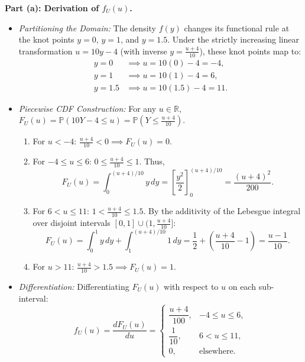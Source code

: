 \documentclass[11pt, letterpaper]{article}
\theoremstyle{definition}
\theoremstyle{remark}
\newcommand{\R}{\mathbb{R}}
\newcommand{\Prob}{\mathbb{P}}
\begin{document}
\textbf{Part (a): Derivation of $f_U(u)$.}
\begin{itemize}
    \item \textit{Partitioning the Domain:} The density $f(y)$ changes its functional rule at the knot points $y = 0$, $y = 1$, and $y = 1.5$. Under the strictly increasing linear transformation $u = 10y - 4$ (with inverse $y = \frac{u + 4}{10}$), these knot points map to:
    \begin{align*}
        y = 0 &\implies u = 10(0) - 4 = -4, \\
        y = 1 &\implies u = 10(1) - 4 = 6, \\
        y = 1.5 &\implies u = 10(1.5) - 4 = 11.
    \end{align*}
    \item \textit{Piecewise CDF Construction:} For any $u \in \R$, $F_U(u) = \Prob(10Y - 4 \le u) = \Prob\left(Y \le \frac{u + 4}{10}\right)$.
    \begin{enumerate}[label=\arabic*.]
        \item For $u < -4$: $\frac{u+4}{10} < 0 \implies F_U(u) = 0$.
        \item For $-4 \le u \le 6$: $0 \le \frac{u+4}{10} \le 1$. Thus,
        \[
            F_U(u) = \int_{0}^{(u+4)/10} y\,dy = \left[ \frac{y^2}{2} \right]_{0}^{(u+4)/10} = \frac{(u + 4)^2}{200}.
        \]
        \item For $6 < u \le 11$: $1 < \frac{u+4}{10} \le 1.5$. By the additivity of the Lebesgue integral over disjoint intervals $[0, 1] \cup (1, \frac{u+4}{10}]$:
        \[
            F_U(u) = \int_{0}^{1} y\,dy + \int_{1}^{(u+4)/10} 1\,dy = \frac{1}{2} + \left(\frac{u + 4}{10} - 1\right) = \frac{u - 1}{10}.
        \]
        \item For $u > 11$: $\frac{u+4}{10} > 1.5 \implies F_U(u) = 1$.
    \end{enumerate}
    \item \textit{Differentiation:} Differentiating $F_U(u)$ with respect to $u$ on each sub-interval:
    \[
        f_U(u) = \frac{dF_U(u)}{du} = \begin{cases} \dfrac{u + 4}{100}, & -4 \le u \le 6, \\[6pt] \dfrac{1}{10}, & 6 < u \le 11, \\[6pt] 0, & \text{elsewhere.} \end{cases}
    \]
\end{itemize}
\end{document}
